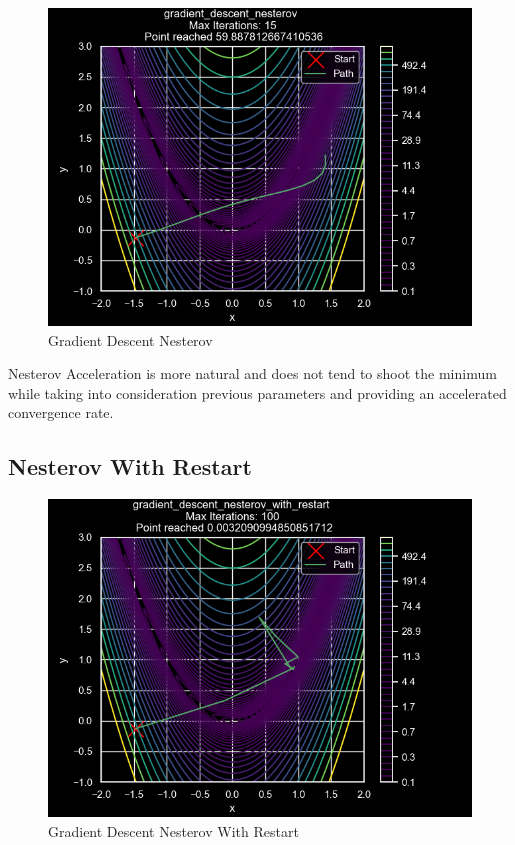 \documentclass[
]{article}
\begin{document}
\begin{figure}
\centering
\includegraphics{images/gradient_descent_nesterov.png}
\caption{Gradient Descent Nesterov}
\end{figure}

Nesterov Acceleration is more natural and does not tend to shoot the minimum while taking into consideration previous parameters and providing an accelerated convergence rate.

\subsection{Nesterov With Restart}\label{nesterov-with-restart}

\begin{figure}
\centering
\includegraphics{images/gradient_descent_nesterov_with_restart.png}
\caption{Gradient Descent Nesterov With Restart}
\end{figure}
\end{document}
